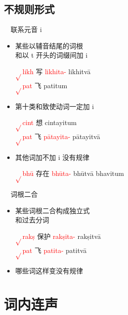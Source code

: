 \documentclass[17pt]{beamer}
\newcommand{\verbroot}[1]{\textcolor{red}{$\sqrt{}$#1}}
\newcommand{\nounstem}[1]{\textcolor{red}{#1\nobreakdash-}}
\newcommand{\fullpada}[1]{\textcolor{OliveGreen}{#1}}
\begin{document}
\subsection{不规则形式}
\begin{frame}{\insertsubsection ~~联系元音 i}
  \begin{itemize}
    \item 某些以辅音结尾的词根\\和以 t 开头的词缀间加 i
    
    \verbroot{likh} 写 \nounstem{likhita} \fullpada{likhitvā}\\
    \verbroot{pat} 飞 \fullpada{patitum} 
    \item 第十类和致使动词一定加 i
    
    \verbroot{cint} 想 \fullpada{cintayitum}\\
    \verbroot{pat} 飞 \nounstem{pātayita} \fullpada{pātayitvā}

    \item 其他词加不加 i 没有规律

    \verbroot{bhū} 存在 \nounstem{bhūta} \fullpada{bhūtvā} \fullpada{bhavitum}
  \end{itemize}  
\end{frame}

\begin{frame}{\insertsubsection ~~词根二合}
  \begin{itemize}
    \item 某些词根二合构成独立式\\和过去分词

    \verbroot{rakṣ} 保护 \nounstem{rakṣita} \fullpada{rakṣitvā}\\
    \verbroot{pat} 飞 \nounstem{patita} \fullpada{patitvā}
    \item 哪些词这样变没有规律
  \end{itemize}  
\end{frame}

\section{词内连声}
\begin{frame}{\insertsection }
  \small
  \tableofcontents[currentsection]
\end{frame}
\end{document}
